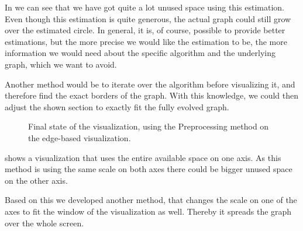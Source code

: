\documentclass
[
    paper = a4,
    pagesize,
    12 pt,
    oneside,                       %
    open = right,
    DIV = calc,
    BCOR = 0 mm,                   %
    bibtotoc
]
{scrbook}
\begin{document}
In  we can see that we have got quite a lot unused space using this estimation.
Even though this estimation is quite generous, the actual graph could still grow over the estimated circle.
In general, it is, of course, possible to provide better estimations, but the more precise we would like the estimation to be, the more information we would need about the specific algorithm and the underlying graph, which we want to avoid.

Another method would be to iterate over the algorithm before visualizing it, and therefore find the exact borders of the graph.
With this knowledge, we could then adjust the shown section to exactly fit the fully evolved graph.

\begin{figure}
\caption[]{Final state of the visualization, using the Preprocessing method on the edge-based visualization.}
\label{fig:preprocessing}
\end{figure}

 shows a visualization that uses the entire available space on one axis.
As this method is using the same scale on both axes there could be bigger unused space on the other axis.

Based on this we developed another method, that changes the scale on one of the axes to fit the window of the visualization as well.
Thereby it spreads the graph over the whole screen.
\end{document}

